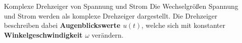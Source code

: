 \begin{frame}
    
    \begin{Merksatz}{Komplexe Drehzeiger von Spannung und Strom}
        Die Wechselgrößen Spannung und Strom werden als komplexe Drehzeiger dargestellt. Die Drehzeiger beschreiben dabei 
            {\bf Augenblickswerte $u(t)$}, welche sich mit konstanter {\bf Winkelgeschwindigkeit $\omega$} verändern. 
    \end{Merksatz}

\end{frame}



